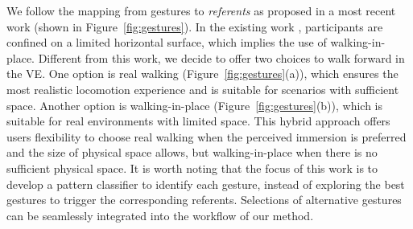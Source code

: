 \documentclass[review]{vgtc}                 %
\begin{document}
We follow the mapping from gestures to \emph{referents} as proposed in a most recent work \cite{felberbaum2018better} (shown in Figure~\ref{fig:gestures}).
In the existing work \cite{felberbaum2018better}, participants are confined on a limited horizontal surface, which implies the use of walking-in-place.
Different from this work, we decide to offer two choices to walk forward in the VE.
One option is real walking (Figure~\ref{fig:gestures}(a)), which ensures the most realistic locomotion experience and is suitable for scenarios with sufficient space.
Another option is walking-in-place (Figure~\ref{fig:gestures}(b)), which is suitable for real environments with limited space.
This hybrid approach offers users flexibility to choose real walking when the perceived immersion is preferred and the size of physical space allows, but walking-in-place when there is no sufficient physical space. 
It is worth noting that the focus of this work is to develop a pattern classifier to identify each gesture, instead of exploring the best gestures to trigger the corresponding referents.
Selections of alternative gestures can be seamlessly integrated into the workflow of our method.



%
%
\end{document}
